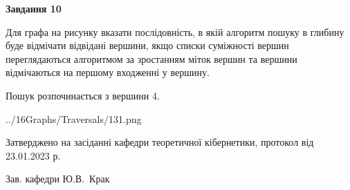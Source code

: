 \documentclass[12pt, ukrainian]{article}
\begin{document}
{\begin {large}
{\begin {center}\textbf{Завдання 10}\end {center}}\par
Для графа на рисунку вказати послідовність, в якій алгоритм пошуку в глибину буде відмічати відвідані вершини, якщо списки суміжності вершин переглядаються алгоритмом за зростанням міток вершин та вершини відмічаються на першому вход\-женні у вершину.\par
Пошук розпочинається з вершини 4.\par

\begin{center}
	{../16Graphs/Traversals/131.png}
\end{center}\par
\newpage


\end {large}
}
{\smallskip \begin {small} Затверджено на засіданні кафедри теоретичної кібернетики, протокол  від   23.01.2023 р.\par\smallskip\smallskip
{\parbox {6.5 cm}{Зав. кафедри \dotfill Ю.В.~Крак}} \end{small}}
\end{document}

